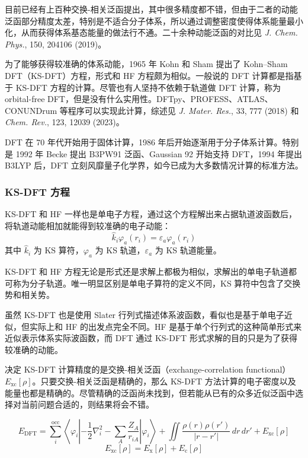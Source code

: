 目前已经有上百种交换-相关泛函提出，其中很多精度都不错，但由于二者的动能泛函部分精度太差，特别是不适合分子体系，所以通过调整密度使得体系能量最小化，从而获得体系基态能量的做法行不通。二十余种动能泛函的对比见 \textit{J. Chem. Phys.}, 150, 204106 (2019)。

为了能够获得较准确的体系动能，1965 年 Kohn 和 Sham 提出了 Kohn--Sham DFT（KS-DFT）方程，形式和 HF 方程颇为相似。一般说的 DFT 计算都是指基于 KS-DFT 方程的计算。尽管也有人坚持不依赖于轨道做 DFT 计算，称为 orbital-free DFT，但是没有什么实用性。DFTpy、PROFESS、ATLAS、CONUNDrum 等程序可以实现此计算，综述见 \textit{J. Mater. Res.}, 33, 777 (2018) 和 \textit{Chem. Rev.}, 123, 12039 (2023)。

DFT 在 70 年代开始用于固体计算，1986 年后开始逐渐用于分子体系计算。特别是 1992 年 Becke 提出 B3PW91 泛函、Gaussian 92 开始支持 DFT，1994 年提出 B3LYP 后，DFT 立刻风靡量子化学界，如今已成为大多数情况计算的标准方法。

\subsubsection*{KS-DFT 方程}

KS-DFT 和 HF 一样也是单电子方程，通过这个方程解出来占据轨道波函数后，将轨道动能相加就能得到较准确的电子动能：
\[
\hat k_i \varphi_a(r_i)=\varepsilon_a \varphi_a(r_i)
\]
其中 $\hat k_i$ 为 KS 算符，$\varphi_a$ 为 KS 轨道，$\varepsilon_a$ 为 KS 轨道能量。

KS-DFT 和 HF 方程无论是形式还是求解上都极为相似，求解出的单电子轨道都可称为分子轨道。唯一明显区别是单电子算符的定义不同，KS 算符中包含了交换势和相关势。

虽然 KS-DFT 也是使用 Slater 行列式描述体系波函数，看似也是基于单电子近似，但实际上和 HF 的出发点完全不同。HF 是基于单个行列式的这种简单形式来近似表示体系实际波函数，而 DFT 通过 KS-DFT 形式求解的目的只是为了获得较准确的动能。

决定 KS-DFT 计算精度的是交换-相关泛函（exchange-correlation functional）$E_{\mathrm{xc}}[\rho]$。只要交换-相关泛函是精确的，那么 KS-DFT 方法计算的电子密度以及能量也都是精确的。尽管精确的泛函尚未找到，但若能从已有的众多近似泛函中选择对当前问题合适的，则结果将会不错。

\begingroup
\small
\[
E_{\mathrm{DFT}}
=
\sum_i^{\mathrm{occ}}
\left\langle \varphi_i \left|
-\frac{1}{2}\nabla_i^2
-\sum_A \frac{Z_A}{r_{iA}}
\right| \varphi_i \right\rangle
+
\iint \frac{\rho(r)\rho(r')}{|r-r'|}\,dr\,dr'
+
E_{\mathrm{xc}}[\rho]
\]
\[
E_{\mathrm{xc}}[\rho]=E_{\mathrm{x}}[\rho]+E_{\mathrm{c}}[\rho]
\]
\endgroup

